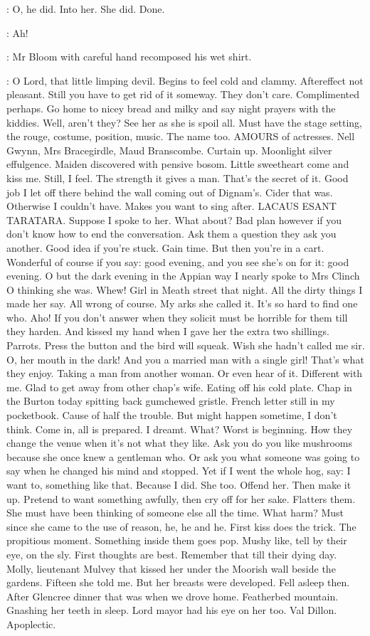 :
O, he did. Into her. She did. Done.

\Bloom:
Ah!

:
Mr Bloom with careful hand recomposed his wet shirt.

\Bloom:
O Lord, that little
limping devil. Begins to feel cold and clammy. Aftereffect not pleasant.
Still you have to get rid of it someway. They don't care. Complimented
perhaps. Go home to nicey bread and milky and say night prayers with the
kiddies. Well, aren't they? See her as she is spoil all. Must have the
stage setting, the rouge, costume, position, music. The name too. AMOURS
of actresses. Nell Gwynn, Mrs Bracegirdle, Maud Branscombe. Curtain up.
Moonlight silver effulgence. Maiden discovered with pensive bosom. Little
sweetheart come and kiss me. Still, I feel. The strength it gives a man.
That's the secret of it. Good job I let off there behind the wall coming
out of Dignam's. Cider that was. Otherwise I couldn't have. Makes you want
to sing after. LACAUS ESANT TARATARA. Suppose I spoke to her. What about?
Bad plan however if you don't know how to end the conversation. Ask them a
question they ask you another. Good idea if you're stuck. Gain time. But
then you're in a cart. Wonderful of course if you say: good evening, and
you see she's on for it: good evening. O but the dark evening in the
Appian way I nearly spoke to Mrs Clinch O thinking she was. Whew! Girl in
Meath street that night. All the dirty things I made her say. All wrong of
course. My arks she called it. It's so hard to find one who. Aho! If you
don't answer when they solicit must be horrible for them till they harden.
And kissed my hand when I gave her the extra two shillings. Parrots. Press
the button and the bird will squeak. Wish she hadn't called me sir. O, her
mouth in the dark! And you a married man with a single girl! That's what
they enjoy. Taking a man from another woman. Or even hear of it.
Different with me. Glad to get away from other chap's wife. Eating off his
cold plate. Chap in the Burton today spitting back gumchewed gristle.
French letter still in my pocketbook. Cause of half the trouble. But might
happen sometime, I don't think. Come in, all is prepared. I dreamt. What?
Worst is beginning. How they change the venue when it's not what they
like. Ask you do you like mushrooms because she once knew a gentleman
who. Or ask you what someone was going to say when he changed his
mind and stopped. Yet if I went the whole hog, say: I want to, something
like that. Because I did. She too. Offend her. Then make it up. Pretend to
want something awfully, then cry off for her sake. Flatters them. She must
have been thinking of someone else all the time. What harm? Must since she
came to the use of reason, he, he and he. First kiss does the trick. The
propitious moment. Something inside them goes pop. Mushy like, tell by
their eye, on the sly. First thoughts are best. Remember that till their
dying day. Molly, lieutenant Mulvey that kissed her under the Moorish wall
beside the gardens. Fifteen she told me. But her breasts were developed.
Fell asleep then. After Glencree dinner that was when we drove home.
Featherbed mountain. Gnashing her teeth in sleep. Lord mayor had his eye
on her too. Val Dillon. Apoplectic.

